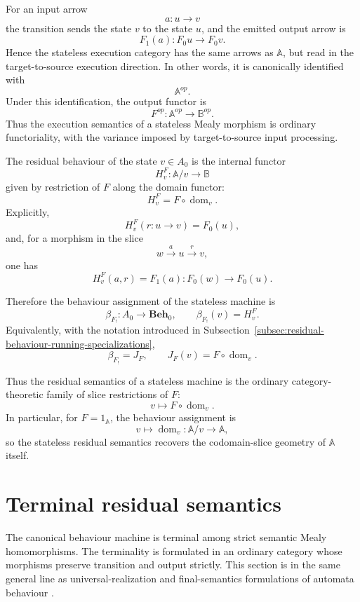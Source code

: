 For an input arrow
\[
    a:u\to v
\]
the transition sends the state \(v\) to the state \(u\), and the emitted output arrow is
\[
    F_1(a):F_0u\to F_0v.
\]
Hence the stateless execution category has the same arrows as \(\mathbb A\), but read in the target-to-source execution direction. In other words, it is canonically identified with
\[
    \mathbb A^{op}.
\]
Under this identification, the output functor is
\[
    F^{op}:\mathbb A^{op}\to\mathbb B^{op}.
\]
Thus the execution semantics of a stateless Mealy morphism is ordinary functoriality, with the variance imposed by target-to-source input processing.

The residual behaviour of the state \(v\in A_0\) is the internal functor
\[
    H^F_v:\mathbb A/v\to\mathbb B
\]
given by restriction of \(F\) along the domain functor:
\[
    H^F_v
        =
    F\circ\operatorname{dom}_v.
\]
Explicitly,
\[
    H^F_v(r:u\to v)=F_0(u),
\]
and, for a morphism in the slice
\[
    w\xrightarrow{a}u\xrightarrow{r}v,
\]
one has
\[
    H^F_v(a,r)=F_1(a):F_0(w)\to F_0(u).
\]

Therefore the behaviour assignment of the stateless machine is
\[
    \beta_{F_!}:A_0\to \mathbf{Beh}_0,
    \qquad
    \beta_{F_!}(v)=H^F_v.
\]
Equivalently, with the notation introduced in Subsection~\ref{subsec:residual-behaviour-running-specializations},
\[
    \beta_{F_!}=J_F,
    \qquad
    J_F(v)=F\circ\operatorname{dom}_v.
\]

Thus the residual semantics of a stateless machine is the ordinary category-theoretic family of slice restrictions of \(F\):
\[
    v\longmapsto F\circ\operatorname{dom}_v.
\]
In particular, for \(F=1_{\mathbb A}\), the behaviour assignment is
\[
    v\longmapsto \operatorname{dom}_v:\mathbb A/v\to\mathbb A,
\]
so the stateless residual semantics recovers the codomain-slice geometry of \(\mathbb A\) itself.

\section{Terminal residual semantics}
\label{sec:terminal-residual-semantics}

The canonical behaviour machine is terminal among strict semantic Mealy homomorphisms. The terminality is formulated in an ordinary category whose morphisms preserve transition and output strictly. This section is in the same general line as universal-realization and final-semantics formulations of automata behaviour \cite{Goguen1973,Rutten1998,Rutten2000}.

